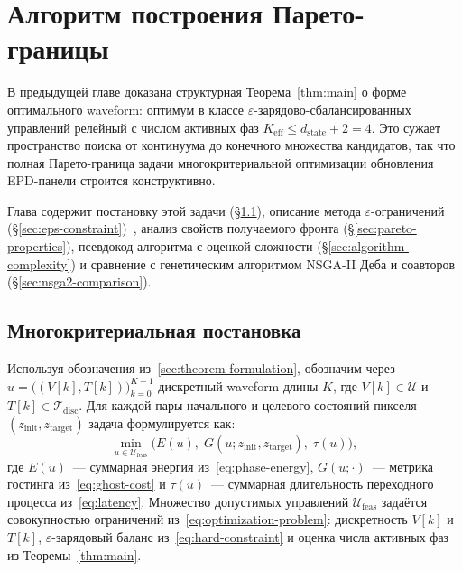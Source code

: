 \chapter{Алгоритм построения Парето-границы}\label{ch:algorithm}

В предыдущей главе доказана структурная Теорема~\ref{thm:main} о форме
оптимального waveform: оптимум в классе $\varepsilon$-зарядово-сбалансированных
управлений релейный с числом активных фаз
$K_{\mathrm{eff}} \le d_{\mathrm{state}} + 2 = 4$. Это сужает пространство
поиска от континуума до конечного множества кандидатов, так что полная
Парето-граница задачи многокритериальной оптимизации обновления EPD-панели
строится конструктивно.

Глава содержит постановку этой задачи (\S\ref{sec:moo-formulation}), описание
метода $\varepsilon$-ограничений
(\S\ref{sec:eps-constraint})~\cite{vasiliev2002_methods}, анализ свойств
получаемого фронта (\S\ref{sec:pareto-properties}), псевдокод алгоритма с
оценкой сложности (\S\ref{sec:algorithm-complexity}) и сравнение с
генетическим алгоритмом NSGA-II Деба и
соавторов~\cite{deb2002_nsga2} (\S\ref{sec:nsga2-comparison}).


\section{Многокритериальная постановка}\label{sec:moo-formulation}

Используя обозначения из~\ref{sec:theorem-formulation}, обозначим через
$u = \bigl((V[k], T[k])\bigr)_{k=0}^{K-1}$ дискретный waveform длины $K$,
где $V[k] \in \mathcal{U}$ и $T[k] \in \mathcal{T}_{\mathrm{disc}}$. Для
каждой пары начального и целевого состояний пикселя $(z_{\mathrm{init}},
z_{\mathrm{target}})$ задача формулируется как:
\begin{equation}\label{eq:moo}
    \min_{u \in \mathcal{U}_{\mathrm{feas}}}
        \bigl( E(u),\; G(u; z_{\mathrm{init}}, z_{\mathrm{target}}),\; \tau(u) \bigr),
\end{equation}
где $E(u)$~--- суммарная энергия из~\eqref{eq:phase-energy},
$G(u; \cdot)$~--- метрика гостинга из~\eqref{eq:ghost-cost} и $\tau(u)$~---
суммарная длительность переходного процесса из~\eqref{eq:latency}.
Множество допустимых управлений $\mathcal{U}_{\mathrm{feas}}$ задаётся
совокупностью ограничений из~\eqref{eq:optimization-problem}: дискретность
$V[k]$ и $T[k]$, $\varepsilon$-зарядовый баланс
из~\eqref{eq:hard-constraint} и оценка числа активных фаз
из Теоремы~\ref{thm:main}.

